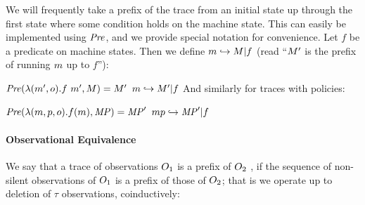 \documentclass[acmsmall,review,anonymous]{acmart}\settopmatter{printfolios=true,printccs=false,printacmref=false}
\begin{document}


We will frequently take a prefix of the trace from an initial state up
through the first state where some condition holds on the machine state.
This can easily be implemented using \(\mathit{Pre}\), and we provide special notation
for convenience.
%
Let \(f\) be a predicate on machine states. Then we define \(m
\hookrightarrow M | f\) (read ``\(M'\) is the prefix of
running \(m\) up to \(f\)''):  

\judgmenttwo{\(\mach \hookrightarrow \machT\)}
            {\(\PUT(\lambda (\mach',\obs).f\ \mach',\machT)
              = \machT'\)}
            {\(m \hookrightarrow M' | f\)}
\noindent
And similarly for traces with policies:

\judgmenttwo{\(\mpstatename \hookrightarrow \MPT\)}
            {\(\mathit{Pre}(\lambda (m,p,o).f(m),\mathit{MP}) = \mathit{MP}'\)}
         {\(mp \hookrightarrow \mathit{MP}' | f\)}


\paragraph*{Observational Equivalence}

We say that a trace of observations $O_1$ is a prefix of $O_2$
, if the
sequence of non-silent observations of $O_1$ is a prefix of those
of $O_2$; that is we operate up to deletion of \(\tau\)
observations, coinductively:
\end{document}
